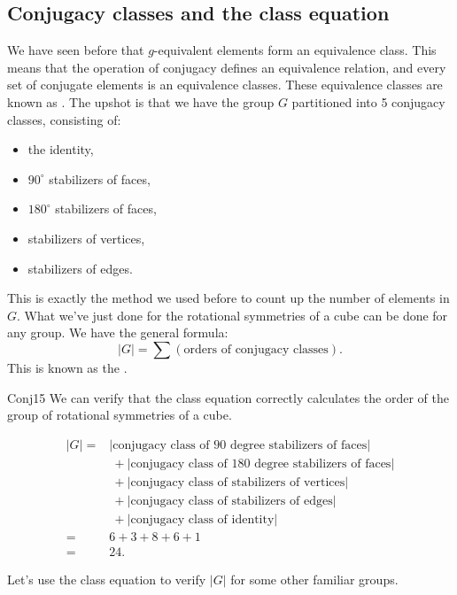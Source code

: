 \subsection{Conjugacy classes and the class equation}

We have seen before that $g$-equivalent elements form an equivalence class. This means that the operation of conjugacy defines an equivalence relation, and every set of conjugate elements is an equivalence classes. These equivalence classes are known as .
The upshot is that we have the group $G$ partitioned into 5 conjugacy classes, consisting of: 
\begin{itemize}
\item
the identity, 
\item
 $90^{\circ}$ stabilizers of faces, 
\item
$180^{\circ}$ stabilizers of faces, 
\item
stabilizers of vertices, 
\item
stabilizers of edges. 
\end{itemize}

This is exactly the method we used before to count up the number of elements in $G$.  
What we've just done for the rotational symmetries of a cube can be done for any group.  We have the general formula:
$$|G| = \sum (\text{orders of conjugacy classes}).$$
This is known as the .

\begin{example}{Conj15}
  We can verify that the class equation correctly calculates the order of the group of rotational symmetries of a cube. 

\begin{align*}
|G|=&|\text{conjugacy class of 90 degree stabilizers of faces}| \\
&~+|\text{conjugacy class of 180 degree stabilizers of faces}|\\
&~+|\text{conjugacy class of stabilizers of vertices}|\\
&~+|\text{conjugacy class of stabilizers of edges}|\\
&~+|\text{conjugacy class of identity}|\\
=&6+3+8+6+1\\
=&24.
\end{align*}
\end{example}

Let's use the class equation to verify $|G|$ for some other familiar groups.  

